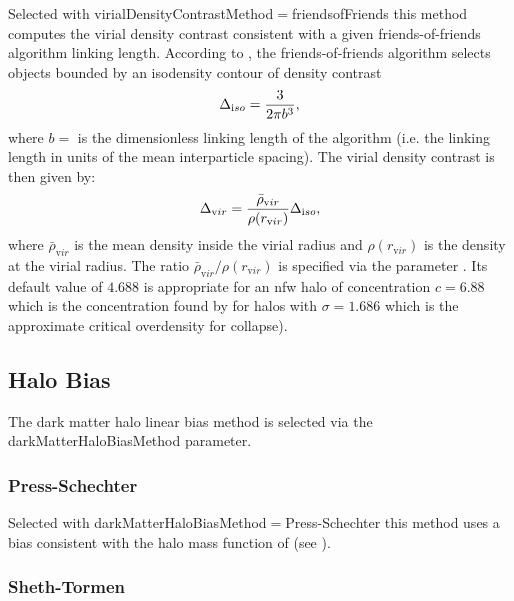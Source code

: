 Selected with {\normalfont \ttfamily virialDensityContrastMethod}$=${\normalfont \ttfamily friendsofFriends} this method computes the virial density contrast consistent with a given friends-of-friends algorithm linking length. According to \cite{lacey_merger_1994}, the friends-of-friends algorithm selects objects bounded by an isodensity contour of density contrast
\begin{equation}
\Delta_{\mathrm iso} = {3 \over 2 \pi b^3},
\end{equation}
where $b=${\normalfont \ttfamily [virialDensityContrastFoFLinkingLength]} is the dimensionless linking length of the algorithm (i.e. the linking length in units of the mean interparticle spacing). The virial density contrast is then given by:
\begin{equation}
\Delta_{\mathrm vir} = {\bar{\rho}_{\mathrm vir} \over \rho(r_{\mathrm vir})} \Delta_{\mathrm iso},
\end{equation}
where $\bar{\rho}_{\mathrm vir}$ is the mean density inside the virial radius and $\rho(r_{\mathrm vir})$ is the density at the virial radius. The ratio $\bar{\rho}_{\mathrm vir} / \rho(r_{\mathrm vir})$ is specified via the parameter {\normalfont \ttfamily [virialDensityContrastFoFDensityRatio]}. Its default value of $4.688$ is appropriate for an \gls{nfw} halo of concentration $c=6.88$ which is the concentration found by \cite{prada_halo_2011} for halos with $\sigma=1.686$ which is the approximate critical overdensity for collapse).

\subsection{Halo Bias}

The dark matter halo linear bias method is selected via the {\normalfont \ttfamily darkMatterHaloBiasMethod} parameter.

\subsubsection{Press-Schechter}

Selected with {\normalfont \ttfamily darkMatterHaloBiasMethod}$=${\normalfont \ttfamily Press-Schechter} this method uses a bias consistent with the halo mass function of \cite{press_formation_1974} (see \citep{mo_analytic_1996}).

\subsubsection{Sheth-Tormen}

